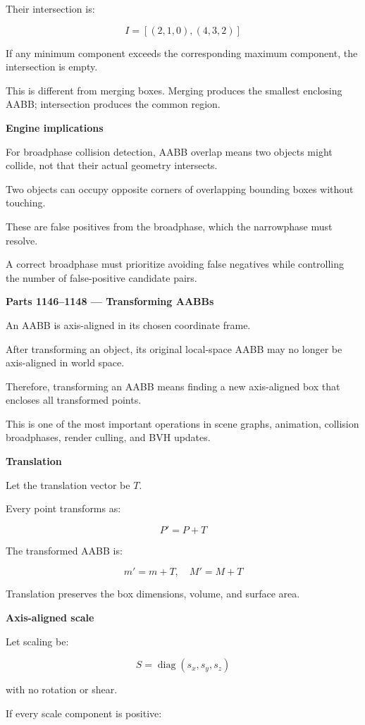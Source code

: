 Their intersection is:

\[
\boxed{I=[(2,1,0),(4,3,2)]}
\]

If any minimum component exceeds the corresponding maximum component, the intersection is empty.

This is different from merging boxes. Merging produces the smallest enclosing AABB; intersection produces the common region.

\textbf{Engine implications}

For broadphase collision detection, AABB overlap means two objects might collide, not that their actual geometry intersects.

Two objects can occupy opposite corners of overlapping bounding boxes without touching.

These are false positives from the broadphase, which the narrowphase must resolve.

A correct broadphase must prioritize avoiding false negatives while controlling the number of false-positive candidate pairs.

\textbf{Parts 1146--1148 --- Transforming AABBs}

An AABB is axis-aligned in its chosen coordinate frame.

After transforming an object, its original local-space AABB may no longer be axis-aligned in world space.

Therefore, transforming an AABB means finding a new axis-aligned box that encloses all transformed points.

This is one of the most important operations in scene graphs, animation, collision broadphases, render culling, and BVH updates.

\textbf{Translation}

Let the translation vector be \(T\).

Every point transforms as:

\[
P'=P+T
\]

The transformed AABB is:

\[
\boxed{ m'=m+T,\quad M'=M+T }
\]

Translation preserves the box dimensions, volume, and surface area.

\textbf{Axis-aligned scale}

Let scaling be:

\[
S=\operatorname{diag}(s_x,s_y,s_z)
\]

with no rotation or shear.

If every scale component is positive:

